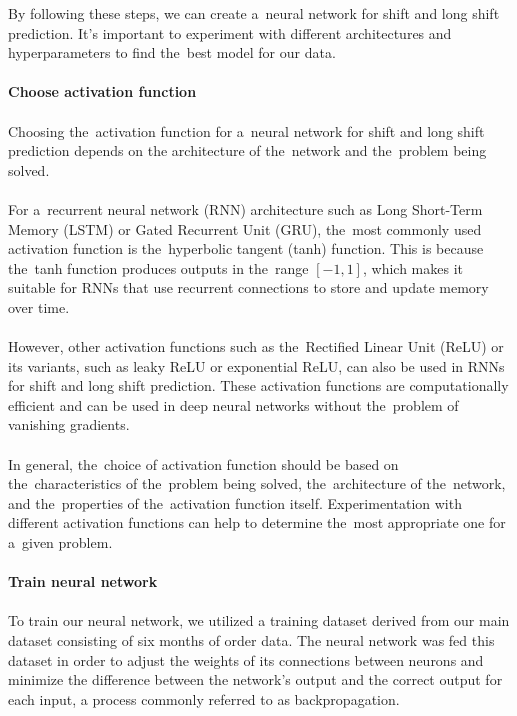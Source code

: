         By following these steps, we can create a~neural network for shift and long shift prediction.
        It's important to experiment with different architectures and hyperparameters to find the~best
        model for our data.\\
        \\
        \textbf{Choose activation function}\\
        \\
        Choosing the~activation function for a~neural network for shift and long shift prediction depends on the
        architecture of the~network and the~problem being solved.\\
        \\
        For a~recurrent neural network (RNN) architecture such as Long Short-Term Memory (LSTM) or
        Gated Recurrent Unit (GRU), the~most commonly used activation function is the~hyperbolic tangent (tanh) function.
        This is because the~tanh function produces outputs in the~range $[-1, 1]$, which makes it suitable for RNNs
        that use recurrent connections to store and update memory over time.\\
        \\
        However, other activation functions such as the~Rectified Linear Unit (ReLU) or its variants, such as leaky
        ReLU or exponential ReLU, can also be used in RNNs for shift and long shift prediction. These activation
        functions are computationally efficient and can be used in deep neural networks without the~problem of
        vanishing gradients.\\
        \\
        In general, the~choice of activation function should be based on the~characteristics of the~problem being
        solved, the~architecture of the~network, and the~properties of the~activation function itself.
        Experimentation with different activation functions can help to determine the~most appropriate one
        for a~given problem.\\
        \\
        \textbf{Train neural network}\\
        \\
        To train our neural network, we utilized a training dataset derived from our main dataset consisting of six months of order data. The neural network was fed this dataset in order to adjust the weights of its connections between neurons and minimize the difference between the network's output and the correct output for each input, a process commonly referred to as backpropagation.\\
